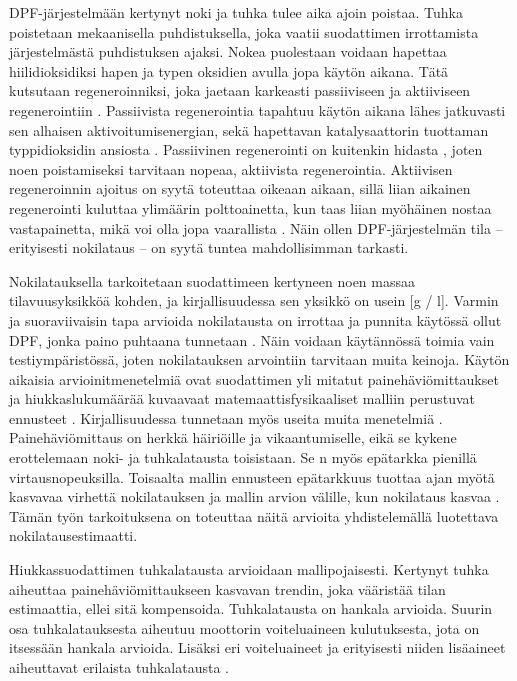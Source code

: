 DPF-järjestelmään kertynyt noki ja tuhka tulee aika ajoin poistaa. Tuhka poistetaan mekaanisella puhdistuksella, joka vaatii suodattimen irrottamista järjestelmästä puhdistuksen ajaksi. Nokea puolestaan voidaan hapettaa hiilidioksidiksi hapen ja typen oksidien avulla jopa käytön aikana. Tätä kutsutaan regeneroinniksi, joka jaetaan karkeasti passiiviseen ja aktiiviseen regenerointiin \cite{Yan_state_of_the_art}.
Passiivista regenerointia tapahtuu käytön aikana lähes jatkuvasti sen alhaisen aktivoitumisenergian, sekä hapettavan katalysaattorin tuottaman typpidioksidin ansiosta \cite{Yan_state_of_the_art}. Passiivinen regenerointi on kuitenkin hidasta \cite{YaoDongwei2023Rodm}, joten noen poistamiseksi tarvitaan nopeaa, aktiivista regenerointia.
Aktiivisen regeneroinnin ajoitus on syytä toteuttaa oikeaan aikaan, sillä liian aikainen regenerointi kuluttaa ylimäärin polttoainetta, kun taas liian myöhäinen nostaa vastapainetta, mikä voi olla jopa vaarallista \cite{YaoDongwei2023Rodm}. 
Näin ollen DPF-järjestelmän tila -- erityisesti nokilataus -- on syytä tuntea mahdollisimman tarkasti. 

Nokilatauksella tarkoitetaan suodattimeen kertyneen noen massaa tilavuusyksikköä kohden, ja kirjallisuudessa sen yksikkö on usein [g / l]. Varmin ja suoraviivaisin tapa arvioida nokilatausta on irrottaa ja punnita käytössä ollut DPF, jonka paino puhtaana tunnetaan \cite{Yan_state_of_the_art}. Näin voidaan käytännössä toimia vain testiympäristössä, joten nokilatauksen arvointiin tarvitaan muita keinoja.
Käytön aikaisia arvioinitmenetelmiä ovat suodattimen yli mitatut painehäviömittaukset ja hiukkaslukumäärää kuvaavaat matemaattisfysikaaliset malliin perustuvat ennusteet \cite{YaoDongwei2023Rodm}. 
Kirjallisuudessa tunnetaan myös useita muita menetelmiä \cite{Yan_state_of_the_art}\cite{dieselnet_sensors_soot}. 
Painehäviömittaus on herkkä häiriöille ja vikaantumiselle, eikä se kykene erottelemaan noki- ja tuhkalatausta toisistaan. Se n myös epätarkka pienillä virtausnopeuksilla.
Toisaalta mallin ennusteen epätarkkuus tuottaa ajan myötä kasvavaa virhettä nokilatauksen ja mallin arvion välille, kun nokilataus kasvaa \cite{YaoDongwei2023Rodm}.
Tämän työn tarkoituksena on toteuttaa näitä arvioita yhdistelemällä luotettava nokilatausestimaatti. 

Hiukkassuodattimen tuhkalatausta arvioidaan mallipojaisesti. 
Kertynyt tuhka aiheuttaa painehäviömittaukseen kasvavan trendin, joka vääristää tilan estimaattia, ellei sitä kompensoida. Tuhkalatausta on hankala arvioida. Suurin osa tuhkalatauksesta aiheutuu moottorin voiteluaineen kulutuksesta, jota on itsessään hankala arvioida. Lisäksi eri voiteluaineet ja erityisesti niiden lisäaineet aiheuttavat erilaista tuhkalatausta \cite{dieselnet_ash} \cite{WangHaohao2019Adid}.

